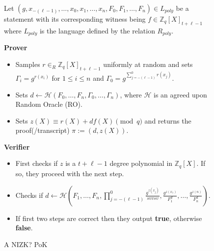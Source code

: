 \begin{figure}[ht]
    \centering
    \begin{tcolorbox}[title=\textbf{A NIZK PoK for Polynomial DL}, width=0.9\textwidth, colframe=blue!75!black, colback=blue!10, sharp corners]
        Let $(g,x_{-(\ell-1)},\dots,x_0,x_1,\dots,x_n,F_0,F_1,\dots,F_n)\in L_{poly}$ be a statement with its corresponding witness being $f\in\mathbb{Z}_q[X]_{t+\ell-1}$ 
        where $L_{poly}$ is the language defined by the relation $R_{poly}$.
        
        \vspace{0.5em}
        \textbf{Prover}
        \begin{itemize}
            \item Samples $r\in_{R}\mathbb{Z}_q[X]_{t+\ell-1}$ uniformly at random and sets 
                $\Gamma_i=g^{r(x_i)}$ for $1\leq i\leq n$ and $\Gamma_0=g^{\sum_{j=-(\ell-1)}^{0}r(x_j)}$.
            \item Sets $d\leftarrow \mathcal{H}(F_0, \dots, F_n, \Gamma_0, \dots, \Gamma_n)$, where $\mathcal{H}$ is 
                an agreed upon Random Oracle (RO).
            \item Sets $z(X)\equiv r(X)+df(X) \pmod{q}$ and returns the proof(/transcript) $\pi:= (d,z(X))$.
        \end{itemize}
        
        \vspace{0.5em}
        \textbf{Verifier}
        \begin{itemize}
            \item First checks if $z$ is a $t+\ell-1$ degree polynomial in $\mathbb{Z}_q[X]$. If so, they proceed with the next step.
            \item Checks if $d\leftarrow \mathcal{H}(F_1, \dots, F_n,\prod_{j=-(\ell-1)}^{0}\frac{g^{z(x_j)}}{svvsv},\frac{g^{z(x_1)}}{F_1^d}, \dots, \frac{g^{z(n)}}{F_n^d})$. 
            \item If first two steps are correct then they output \textbf{true}, otherwise \textbf{false}.
        \end{itemize}
    \end{tcolorbox}
    \caption{A NIZK? PoK}
    \label{fig:poly}
\end{figure}
